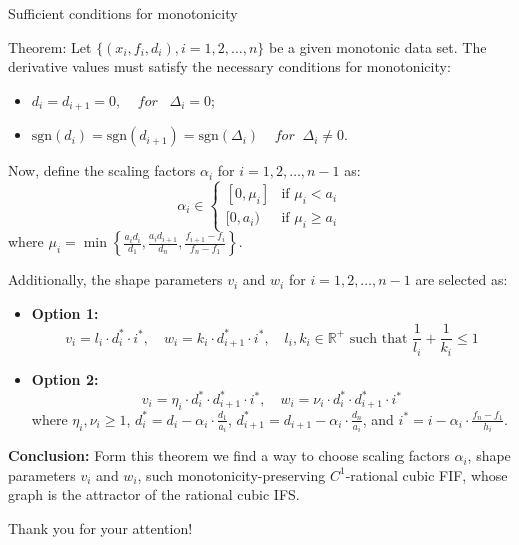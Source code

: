 \documentclass{beamer}
\begin{document}
\begin{frame}{Sufficient conditions for monotonicity}
    \begin{block}{Theorem:}
        Let $\{(x_i, f_i, d_i), i = 1, 2, \dots, n\}$ be a given monotonic data set. 
        The derivative values must satisfy the necessary conditions for monotonicity:
        \begin{itemize}
            \item $d_i = d_{i+1} = 0 ,\;\;\;\;for \;\;\;\Delta_{i}=0;$
            \item $\text{sgn}(d_i) = \text{sgn}(d_{i+1}) = \text{sgn}(\Delta_{i}) \;\;\;\;for\;\;\Delta_{i}\neq 0.$
        \end{itemize}
        
        Now, define the scaling factors $\alpha_i$ for $i = 1, 2, \dots, n-1$ as:
        \[
        \alpha_i \in 
        \begin{cases} 
        [0, \mu_i] & \text{if } \mu_i < a_i \\
        [0, a_i) & \text{if } \mu_i \geq a_i
        \end{cases}
        \]
        where $\mu_i = \min\left\{ \frac{a_i d_i}{d_1}, \frac{a_i d_{i+1}}{d_n}, \frac{f_{i+1} - f_i}{f_n - f_1} \right\}$.
        
        Additionally, the shape parameters $v_i$ and $w_i$ for $i = 1, 2, \dots, n-1$ are selected as:
        
            \end{block} 
            \end{frame}
            \begin{frame}{}
            \begin{itemize}
                 \item \textbf{Option 1:}
            \[
            v_i = l_i \cdot d_i^* \cdot i^*, \quad w_i = k_i \cdot d_{i+1}^* \cdot i^*, \quad l_i, k_i \in \mathbb{R}^+ \text{ such that } \frac{1}{l_i} + \frac{1}{k_i} \leq 1
            \]
               \item \textbf{Option 2:}
            \[
            v_i = \eta_i \cdot d_i^* \cdot d_{i+1}^* \cdot i^*, \quad w_i = \nu_i \cdot d_i^* \cdot d_{i+1}^* \cdot i^*
            \]
            where $\eta_i, \nu_i \geq 1$, $d_i^* = d_i - \alpha_i \cdot \frac{d_1}{a_i}$, $d_{i+1}^* = d_{i+1} - \alpha_i \cdot \frac{d_n}{a_i}$, and $i^* = i - \alpha_i \cdot \frac{f_n - f_1}{h_i}$.
        \end{itemize}
        
        \vskip 0.3cm
        \textbf{Conclusion:} Form this theorem we find a way to choose  scaling factors $\alpha_i$, shape parameters $v_i$ and $w_i$, such  monotonicity-preserving $C^1$-rational cubic FIF, whose graph is the attractor of the rational cubic IFS.
    
            \end{frame}
            

\begin{frame}{}
    \centering
    Thank you for your attention!\\
    
\end{frame}
\end{document}
